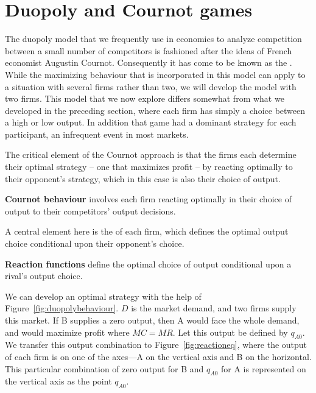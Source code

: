 \section{Duopoly and Cournot games}	\label{sec:duopolycournot}

The duopoly model that we frequently use in economics to analyze competition between a small number of competitors is fashioned after the ideas of French economist Augustin Cournot. Consequently it has come to be known as the . While the maximizing behaviour that is incorporated in this model can apply to a situation with several firms rather than two, we will develop the model with two firms. This model that we now explore differs somewhat from what we developed in the preceding section, where each firm has simply a choice between a high or low output. In addition that game had a dominant strategy for each participant, an infrequent event in most markets. 

The critical element of the Cournot approach is that the firms each determine their optimal strategy -- one that maximizes profit -- by reacting optimally to their opponent's strategy, which in this case is also their choice of output.

\begin{DefBox}
\textbf{Cournot behaviour} involves each firm reacting optimally in their choice of output to their competitors' output decisions.
\end{DefBox}

A central element here is the  of each firm, which defines the optimal output choice conditional upon their opponent's choice.  

\begin{DefBox}
\textbf{Reaction functions} define the optimal choice of output conditional upon a rival's output choice.
\end{DefBox}

We can develop an optimal strategy with the help of Figure~\ref{fig:duopolybehaviour}. $D$ is the market demand, and two firms supply this market. If B supplies a zero output, then A would face the whole demand, and would maximize profit where $MC=MR$. Let this output be defined by $q_{A0}$. We transfer this output combination to Figure~\ref{fig:reactioneq}, where the output of each firm is on one of the axes---A on the vertical axis and B on the horizontal. This particular combination of zero output for B and $q_{A0}$ for A is represented on the vertical axis as the point $q_{A0}$.

